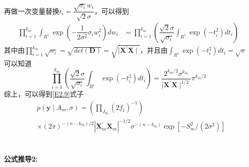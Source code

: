 \documentclass[12pt]{article} %
\begin{document}
	再做一次变量替换$t_i = \dfrac{\sqrt{\sigma_i } w_i }{\sqrt{2} \sigma}$，可以得到
	\begin{equation*}
		\begin{aligned}
			\prod_{i=1}^{k_m} \int_{R^1} \exp ( -\dfrac{1}{2\sigma^2  } \sigma_i w_i^2) d w_i &= \prod_{i=1}^{k_m} \left( \dfrac{\sqrt{2} \sigma}{\sqrt{\sigma_i}}  \int_{R^1} \exp(-t_i^2) dt_i  \right)
		\end{aligned}
	\end{equation*}
	其中由$\prod_{i=1}^{k_m} \sqrt{\sigma_i} = \sqrt{det(\mathbf{D})} = \sqrt{\mid \mathbf{X}^\prime \mathbf{X}\mid}$，并且由$\int_{R^1} \exp(-t_i^2) dt_i =\sqrt{\pi} $可以知道
	\begin{equation*}
		 \prod_{i=1}^{k_m} \left( \dfrac{\sqrt{2} \sigma}{\sqrt{\sigma_i}}  \int_{R^1} \exp(-t_i^2) dt_i  \right) = \dfrac{2^{k_m/2} \sigma^{k_m}}{\mid \mathbf{X}^\prime \mathbf{X} \mid^{1/2} } \pi^{k_m/2}
	\end{equation*}
	综上，可以得到\eqref{E2.9}式子
	\begin{equation*}
		\begin{aligned}
			&p\left(\mathbf{y} \mid A_{m}, \sigma\right)=\left(\prod_{J_{m}}\left(2 f_{j}\right)^{-1}\right) \\
			&\times(2 \pi)^{-\left(n-k_{m}\right) / 2}\left|\mathbf{X}_{m}^{\prime} \mathbf{X}_{m}\right|^{-1 / 2} \sigma^{-\left(n-k_{m}\right)} \exp \left[-S_{m}^{2} /\left(2 \sigma^{2}\right)\right] 
		\end{aligned}
	\end{equation*}
	~\\ \\
	\textbf{公式推导2:}
	
\end{document}
